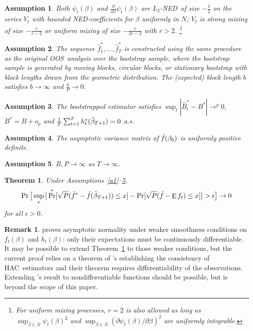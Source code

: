 \documentclass[12pt,fleqn]{article}
\newcommand\citepos[2][]{\citeauthor{#2}'s \citeyearpar[#1]{#2}}
\newtheorem{thm}{Theorem}
\newtheorem{asmp}{Assumption}[section]
\theoremstyle{definition}
\newtheorem{rem}{Remark}
\DeclareMathOperator{\E}{E}
\DeclareMathOperator{\pr}{Pr}
\newcommand{\btrue}[1][]{\if#1*\hat\beta_{T+1}\else\beta_0\fi}
\newcommand{\hac}{HAC}
\newcommand{\ned}{NED}
\newcommand{\oos}{OOS}
\begin{document}
\begin{asmp}\label{a3}
  Both $\psi_t(\beta)$ and $\frac{\partial}{\partial \beta}
  \psi_t(\beta)$ are $L_2$-\ned\ of size $-\frac12$ on the series
  $V_t$ with bounded \ned-coefficients for $\beta$ uniformly in $N$;
  $V_t$ is strong mixing of size $-\frac{r}{r-2}$ or uniform mixing of
  size $-\frac{r}{2r-2}$ with $r > 2$.%
  \footnote{For uniform mixing processes, $r = 2$ is also allowed as
    long as $\sup_{\beta \in N} \psi_t(\beta)^2$ and $\sup_{\beta \in
      N} (\partial \psi_t(\beta) / \partial \beta)^2$ are uniformly
    integrable.} %
\end{asmp}

\begin{asmp}\label{a4}
  The sequence $\hat f_1^{*},\dots,\hat f_T^{*}$ is constructed using
  the same procedure as the original \oos\ analysis over the bootstrap
  sample, where the bootstrap sample is generated by moving blocks,
  circular blocks, or stationary bootstrap with block lengths drawn
  from the geometric distribution.  The (expected) block length $b$
  satisfies $b \to \infty$ and $\frac{b}{P} \to 0$.
\end{asmp}

\begin{asmp}\label{a5}
  The bootstrapped estimator satisfies $\sup_t |\hat{B}_t^{*} - B^{*}|
  \to^p 0$, $B^{*} = B + o_p$ and $\frac1T \sum_{t=1}^T
  h_t^*(\btrue[*]) = 0$ a.s.
\end{asmp}

\begin{asmp}\label{a6}
  The asymptotic variance matrix of $\bar{f}(\btrue)$ is uniformly
  positive definite.
\end{asmp}

\begin{asmp}\label{a7}
  $R, P \to \infty$ as $T \to \infty$.
\end{asmp}

\begin{thm}\label{res:3}
  Under Assumptions~\ref{a1}--\ref{a7},
  \begin{equation}
    \pr\big[\sup_x \big\lvert \pr^*[\sqrt{P} (\bar{f}^* - \bar{f}(\btrue[*])) \leq x]
    - \pr[\sqrt{P}( \bar{f} - \E f_t) \leq x] \big\rvert > \epsilon\big] \to 0
  \end{equation}
  for all $\epsilon > 0$.
\end{thm}

\begin{rem}
  \citet{Mcc:00} proves asymptotic normality under weaker smoothness
  conditions on $f_t(\beta)$ and $h_t(\beta)$: only their expectations
  must be continuously differentiable.  It may be possible to extend
  Theorem~\ref{res:3} to those weaker conditions, but the current
  proof relies on a theorem of \citepos{JoD:00} establishing the
  consistency of \hac\ estimators and their theorem requires differentiability of
  the observations.  Extending \citepos{JoD:00} result to
  nondifferentiable functions should be possible, but is beyond the
  scope of this paper.
\end{rem}
\end{document}
